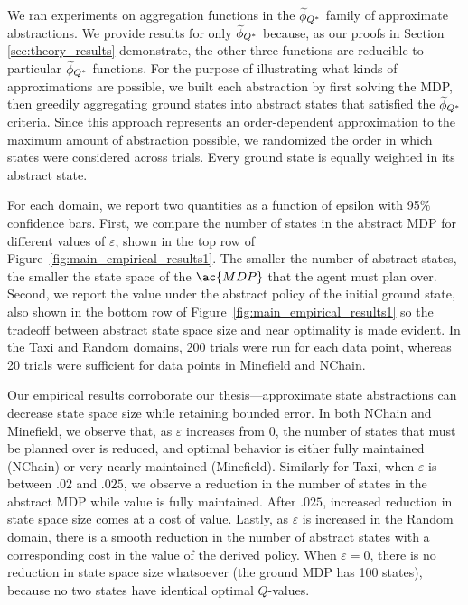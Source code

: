 We ran experiments on aggregation functions in the $\widetilde \phi_{Q^*}$ family of approximate abstractions. We provide results for only $\widetilde \phi_{Q^*}$ because, as our proofs in Section \ref{sec:theory_results} demonstrate, the other three functions are reducible to particular $\widetilde \phi_{Q^*}$ functions. For the purpose of illustrating what kinds of approximations are possible, we built each abstraction by first solving the MDP, then greedily aggregating ground states into abstract states that satisfied the $\widetilde \phi_{Q^*}$ criteria. Since this approach represents an order-dependent approximation to the maximum amount of abstraction possible, we randomized the order in which states were considered across trials. Every ground state is equally weighted in its abstract state.


For each domain, we report two quantities as a function of epsilon with 95\% confidence bars. First, we compare the number of states in the abstract \ac{MDP} for different values of $\varepsilon$, shown in the top row of Figure~\ref{fig:main_empirical_results1}. The smaller the number of abstract states, the smaller the state space of the $\ac{MDP}$ that the agent must plan over. Second, we report the value under the abstract policy of the initial ground state, also shown in the bottom row of Figure~\ref{fig:main_empirical_results1} so the tradeoff between abstract state space size and near optimality is made evident. In the Taxi and Random domains, 200 trials were run for each data point, whereas 20 trials were sufficient for data points in Minefield and NChain.

Our empirical results corroborate our thesis---approximate state abstractions can decrease state space size while retaining bounded error. In both NChain and Minefield, we observe that, as $\varepsilon$ increases from $0$, the number of states that must be planned over is reduced, and optimal behavior is either fully maintained (NChain) or very nearly maintained (Minefield). Similarly for Taxi, when $\varepsilon$ is between $.02$ and $.025$, we observe a reduction in the number of states in the abstract \ac{MDP} while value is fully maintained. After $.025$, increased reduction in state space size comes at a cost of value. Lastly, as $\varepsilon$ is increased in the Random domain, there is a smooth reduction in the number of abstract states with a corresponding cost in the value of the derived policy. When $\varepsilon = 0$, there is no reduction in state space size whatsoever (the ground \ac{MDP} has 100 states), because no two states have identical optimal $Q$-values.

